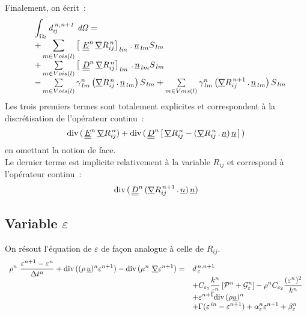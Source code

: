 Finalement, on écrit~:
\begin{equation}
\begin{array} {lll}
&\displaystyle\int_{\Omega_l} \it{d}_{ij}^{\,n,n+1}\ d\Omega =\\
&\displaystyle
+ \sum\limits_{m\in
Vois(l)} \left[\ \underline{\underline{E}}^n\,\underline{\nabla}{R}^{\,n}_{ij} \right]_{\,lm}\,.\,\underline{n}_{\,lm}S_{\,lm}\\
&+ \sum\limits_{m\in Vois(l)} \left[\
\underline{\underline{D}}^n\,\underline{\nabla}{R}^{\,n}_{ij} \right]_{\,lm}\,.\,\underline{n}_{\,lm}S_{\,lm}\\
& - \sum\limits_{m\in Vois(l)} \gamma^n_{\,lm} \left(
\underline{\nabla}{R}^{\,n}_{ij}\,.\,\underline{n}_{\,lm} \right) S_{\,lm} +  \sum\limits_{m\in
Vois(l)} \gamma^n_{\,lm} \left( \underline{\nabla}{R}^{\,n+1}_{ij}\,.\,\underline{n}_{\,lm} \right)  S_{\,lm}
\end{array}
\end{equation}
Les trois premiers termes sont totalement explicites et correspondent à la
discrétisation de l'opérateur continu~:
$$\text{div}\,(\,\underline{\underline{E}}^n\,\underline{\nabla}{R}^{\,n}_{ij}) + \text{div}\,(\,\underline{\underline{D}}^n\,[\,\underline{\nabla}{R}^{\,n}_{ij} - ( \underline{\nabla}{R}^{\,n}_{ij}\,.\,\underline{n}
)\,\underline{n}\,]\,)$$ en omettant la notion de face.\\
Le dernier terme est implicite relativement à la variable $R_{ij}$ et correspond à l'opérateur continu~:
 $$\text{div}\,(\,\underline{\underline{D}}^n\,(\underline{\nabla}{R}^{\,n+1}_{ij}\,.\,\underline{n} )\,\underline{n})$$
\subsection*{\bf Variable $\varepsilon$ }
On résout l'équation de $\varepsilon$ de façon analogue à celle de
$R_{ij}$.
\begin{equation}
\begin{array}{ll}
\displaystyle
\rho^n\ \frac {\varepsilon^{n+1}-\varepsilon^{n}}{\Delta t^n} +
\text{div}\,((\rho\,\underline{u})^{n} \varepsilon^{n+1})
- \text{div}\,(\mu^n\ \underline{\nabla} \varepsilon^{n+1})
=  &
\displaystyle
d_{\,\varepsilon}^{\,n,n+1} \\
&
\displaystyle
+ C_{\varepsilon_1} \frac{k^n}{\varepsilon^n} \left[ \mathcal{P}^n + \mathcal{G}^n_{\varepsilon} \right]
- \rho^n C_{\varepsilon_2} \frac{(\varepsilon^n)^2}{k^n} \\
&
\displaystyle
+ \varepsilon^{n+1} \text{div}\,{(\rho \underline{u})^n} \\
&
\displaystyle
+ \Gamma(\varepsilon^{\,in} - \varepsilon^{n+1})
+ \alpha^n_{\varepsilon} \varepsilon^{n+1} + \beta^n_{\varepsilon}
\end{array}
\end{equation}

